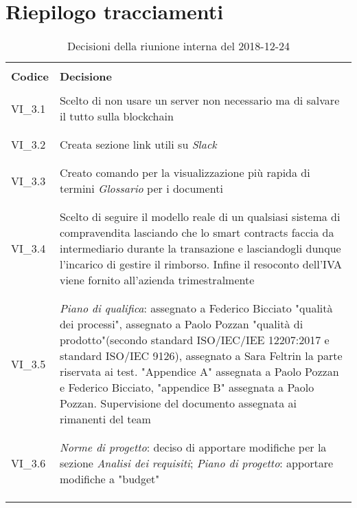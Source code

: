 \section{Riepilogo tracciamenti}
\begin{centering}
\begin{longtable}{ >{\centering}p{4cm} >{\centering}p{11cm} }

\hline
\\[0.5pt]
	\textbf{Codice} & \textbf{Decisione} 
	
	\tabularnewline 
	\hline
						
				\\[0.5pt]
				VI\_3.1 & Scelto di non usare un server non necessario ma di salvare il tutto sulla blockchain
				\\[0.5pt]
				\tabularnewline
				\hline
				
				\\[0.5pt]
				VI\_3.2 & Creata sezione link utili su \textit{Slack}
				\\[0.5pt]
				\tabularnewline
				\hline
				
				\\[0.5pt]				
				VI\_3.3 & Creato comando per la visualizzazione più rapida di termini \textit{Glossario} per i documenti
				\\[0.5pt]
				\tabularnewline
				\hline
				
				\\[0.5pt]
				VI\_3.4 & Scelto di seguire il modello reale di un qualsiasi sistema di compravendita lasciando che lo smart contracts faccia da intermediario durante la transazione e lasciandogli dunque l'incarico di gestire il rimborso. Infine il resoconto dell'IVA viene fornito all'azienda trimestralmente
				\\[0.5pt]
				\tabularnewline
				\hline
				
				\\[0.5pt]
				VI\_3.5 & \textit{Piano di qualifica}: assegnato a Federico Bicciato "qualità dei processi", assegnato a Paolo Pozzan "qualità di prodotto"(secondo standard ISO/IEC/IEE 12207:2017 e standard ISO/IEC 9126), assegnato a Sara Feltrin la parte riservata ai test. "Appendice A" assegnata a Paolo Pozzan e Federico Bicciato, "appendice B" assegnata a Paolo Pozzan. Supervisione del documento assegnata ai rimanenti del team
				\\[0.5pt]
				\tabularnewline
				\hline
		
				\\[0.5pt]
				VI\_3.6 & \textit{Norme di progetto}: deciso di apportare modifiche per la sezione \textit{Analisi dei requisiti}; \textit{Piano di progetto}: apportare modifiche a "budget"
				\\[0.5pt]
				\tabularnewline
				\hline          	
                
        \\[0.7pt]
        \caption{Decisioni della riunione interna del 2018-12-24}
\end{longtable}
\end{centering}

